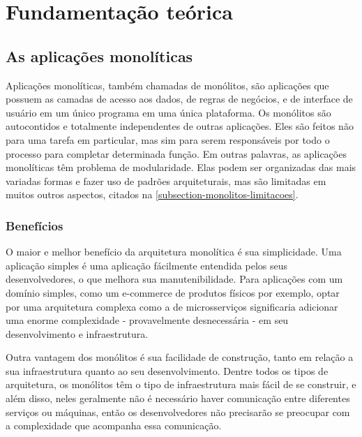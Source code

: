 \chapter{Fundamentação teórica}\label{chapter-fundamentacao}


\section{As aplicações monolíticas}

Aplicações monolíticas, também chamadas de monólitos, são aplicações que possuem as camadas de acesso aos dados, de regras de negócios, e de interface de usuário em um único programa em uma única plataforma. Os monólitos são autocontidos e totalmente independentes de outras aplicações. Eles são feitos não para uma tarefa em particular, mas sim para serem responsáveis por todo o processo para completar determinada função. Em outras palavras, as aplicações monolíticas têm problema de modularidade. Elas podem ser organizadas das mais variadas formas e fazer uso de padrões arquiteturais, mas são limitadas em muitos outros aspectos, citados na \autoref{subsection-monolitos-limitacoes}.

\subsection{Benefícios}

O maior e melhor benefício da arquitetura monolítica é sua simplicidade. Uma aplicação simples é uma aplicação fácilmente entendida pelos seus desenvolvedores, o que melhora sua manutenibilidade. Para aplicações com um domínio simples, como um e-commerce de produtos físicos por exemplo, optar por uma arquitetura complexa como a de microsserviços significaria adicionar uma enorme complexidade - provavelmente desnecessária - em seu desenvolvimento e infraestrutura.

Outra vantagem dos monólitos é sua facilidade de construção, tanto em relação a sua infraestrutura quanto ao seu desenvolvimento. Dentre todos os tipos de arquitetura, os monólitos têm o tipo de infraestrutura mais fácil de se construir, e além disso, neles geralmente não é necessário haver comunicação entre diferentes serviços ou máquinas, então os desenvolvedores não precisarão se preocupar com a complexidade que acompanha essa comunicação.

